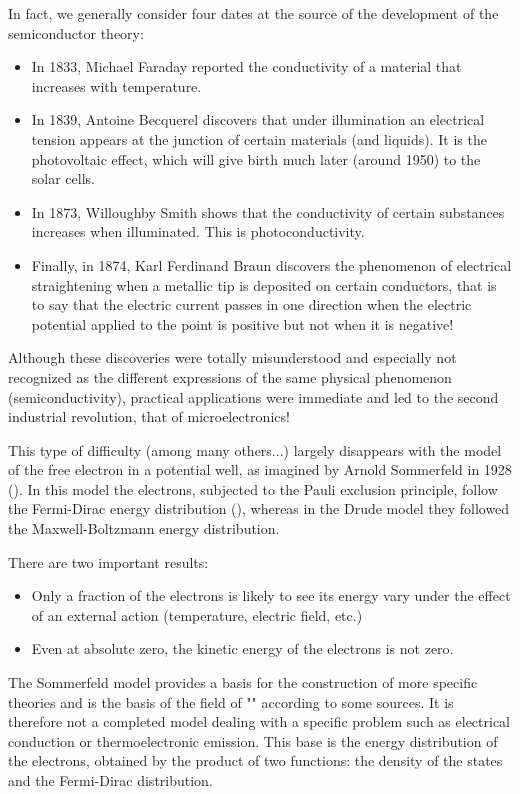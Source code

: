 	In fact, we generally consider four dates at the source of the development of the semiconductor theory:
	\begin{itemize}
		\item In 1833, Michael Faraday reported the conductivity of a material that increases with temperature.

		\item In 1839, Antoine Becquerel discovers that under illumination an electrical tension appears at the junction of certain materials (and liquids). It is the photovoltaic effect, which will give birth much later (around 1950) to the solar cells.

		\item In 1873, Willoughby Smith shows that the conductivity of certain substances increases when illuminated. This is photoconductivity.

		\item Finally, in 1874, Karl Ferdinand Braun discovers the phenomenon of electrical straightening when a metallic tip is deposited on certain conductors, that is to say that the electric current passes in one direction when the electric potential applied to the point is positive but not when it is negative!
	\end{itemize}
	Although these discoveries were totally misunderstood and especially not recognized as the different expressions of the same physical phenomenon (semiconductivity), practical applications were immediate and led to the second industrial revolution, that of microelectronics!
	
	This type of difficulty (among many others...) largely disappears with the model of the free electron in a potential well, as imagined by Arnold Sommerfeld in 1928 (). In this model the electrons, subjected to the Pauli exclusion principle, follow the Fermi-Dirac energy distribution (), whereas in the Drude model they followed the Maxwell-Boltzmann energy distribution.

	There are two important results:
	\begin{itemize}
		\item Only a fraction of the electrons is likely to see its energy vary under the effect of an external action (temperature, electric field, etc.)

		\item Even at absolute zero, the kinetic energy of the electrons is not zero.
	\end{itemize}
	The Sommerfeld model provides a basis for the construction of more specific theories and is the basis of the field of "" according to some sources. It is therefore not a completed model dealing with a specific problem such as electrical conduction or thermoelectronic emission. This base is the energy distribution of the electrons, obtained by the product of two functions: the density of the states and the Fermi-Dirac distribution.
	
